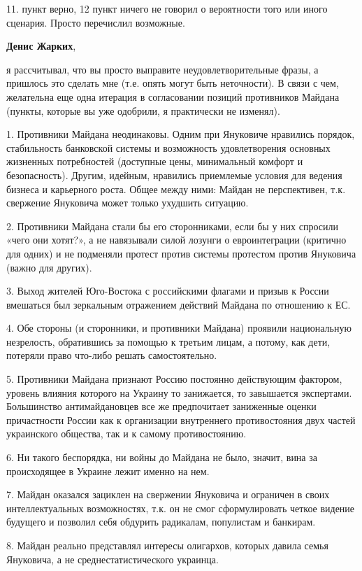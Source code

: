 \begin{itemize}

11. пункт верно, 12 пункт ничего не говорил о вероятности того или иного
сценария. Просто перечислил возможные.

\textbf{Денис Жарких}, 

я рассчитывал, что вы просто выправите неудовлетворительные фразы, а пришлось
это сделать мне (т.е. опять могут быть неточности). В связи с чем, желательна
еще одна итерация в согласовании позиций противников Майдана (пункты, которые
вы уже одобрили, я практически не изменял).

1. Противники Майдана неодинаковы. Одним при Януковиче нравились порядок,
стабильность банковской системы и возможность удовлетворения основных жизненных
потребностей (доступные цены, минимальный комфорт и безопасность). Другим,
идейным, нравились приемлемые условия для ведения бизнеса и карьерного роста.
Общее между ними: Майдан не перспективен, т.к. свержение Януковича может только
ухудшить ситуацию.

2. Противники Майдана стали бы его сторонниками, если бы у них спросили «чего
они хотят?», а не навязывали силой лозунги о евроинтеграции (критично для
одних) и не подменяли протест против системы протестом против Януковича (важно
для других).

3. Выход жителей Юго-Востока с российскими флагами и призыв к России вмешаться
был зеркальным отражением действий Майдана по отношению к ЕС.

4. Обе стороны (и сторонники, и противники Майдана) проявили национальную
незрелость, обратившись за помощью к третьим лицам, а потому, как дети,
потеряли право что-либо решать самостоятельно.

5. Противники Майдана признают Россию постоянно действующим фактором, уровень
влияния которого на Украину то занижается, то завышается экспертами.
Большинство антимайдановцев все же предпочитает заниженные оценки причастности
России как к организации внутреннего противостояния двух частей украинского
общества, так и к самому противостоянию.

6. Ни такого беспорядка, ни войны до Майдана не было, значит, вина за
происходящее в Украине лежит именно на нем.

7. Майдан оказался зациклен на свержении Януковича и ограничен в своих
интеллектуальных возможностях, т.к. он не смог сформулировать четкое видение
будущего и позволил себя обдурить радикалам, популистам и банкирам.

8. Майдан реально представлял интересы олигархов, которых давила семья
Януковича, а не среднестатистического украинца.


\end{itemize}
